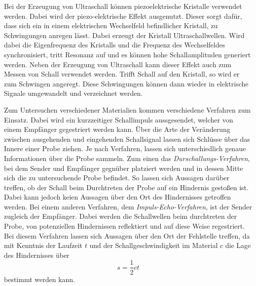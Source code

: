 Bei der Erzeugung von Ultraschall können piezoelektrische Kristalle verwendet werden. Dabei wird der piezo-elektrische Effekt ausgenutzt. Dieser sorgt dafür, dass sich ein in einem elektrischen Wechselfeld befindlicher Kristall, zu Schwingungen anregen lässt. Dabei erzeugt der Kristall Ultraschallwellen. Wird dabei die Eigenfrequenz des Kristalls und die Frequenz des Wechselfeldes synchronisiert, tritt Resonanz auf und es können hohe Schallamplituden generiert werden. Neben der Erzeugung von Ultraschall kann dieser Effekt auch zum Messen von Schall verwendet werden. Trifft Schall auf den Kristall, so wird er zum Schwingen angeregt. Diese Schwingungen können dann wieder in elektrische Signale umgewandelt und verzeichnet werden.

Zum Untersuchen verschiedener Materialien kommen verschiedene Verfahren zum Einsatz. Dabei wird ein kurzzeitiger Schallimpuls aussgesendet, welcher von einem Empfänger gegestriert werden kann. Über die Arte der Veränderung zwischen ausgehenden und eingehenden Schallsignal lassen sich Schlüsse über das Innere einer Probe ziehen. Je nach Verfahren, lassen sich unterschiedlich genaue Informationen über die Probe sammeln. Zum einen das \textit{Durschallungs-Verfahren}, bei dem Sender und Empfänger gegnüber platziert werden und in dessen Mitte sich die zu untersuchende Probe befindet. So lassen sich Aussagen darüber treffen, ob der Schall beim Durchtreten der Probe auf ein Hindernis gestoßen ist. Dabei kann jedoch keien Aussagen über den Ort des Hindernisses getroffen werden. 
Bei einem anderen Verfahren, dem \textit{Impuls-Echo-Verfahren}, ist der Sender zugleich der Empfänger. Dabei werden die Schallwellen beim durchtreten der Probe, von potenziellen Hindernissen reflektiert und auf diese Weise regestriert. Bei diesem Verfahren lassen sich Aussagen über den Ort der Fehlstelle treffen, da mit Kenntnis der Laufzeit $t$ und der Schallgeschwindigkeit im Material $c$ die Lage des Hindernisses über
\begin{equation}
    s=\frac{1}{2}ct
\end{equation}
bestimmt werden kann.






